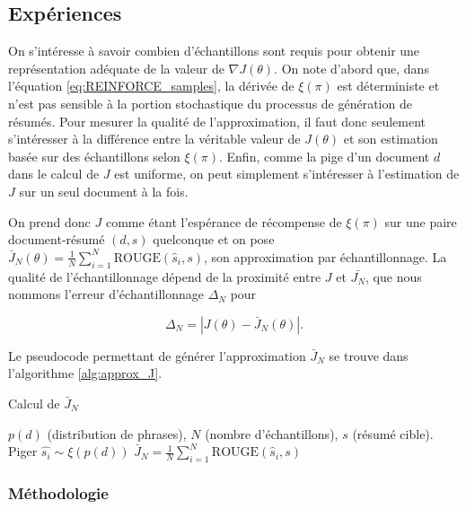 \subsection{Expériences}

On s'intéresse à savoir combien d'échantillons sont requis pour obtenir une représentation 
adéquate de la valeur de $\nabla J(\theta)$.
On note d'abord que, dans l'équation \eqref{eq:REINFORCE_samples}, la dérivée de $\xi(\pi)$ est déterministe
et n'est pas sensible à la portion stochastique du processus de génération de résumés.
Pour mesurer la qualité de l'approximation, il faut donc seulement s'intéresser
à la différence entre la véritable valeur de $J(\theta)$ et son estimation 
basée sur des échantillons selon $\xi(\pi)$.
Enfin, comme la pige d'un document $d$ dans le calcul de $J$ est uniforme, on
peut simplement s'intéresser à l'estimation de $J$ sur un seul document à la fois.


On prend donc $J$ comme étant l'espérance de récompense de $\xi(\pi)$ sur une paire 
document-résumé $(d, s)$ quelconque et on pose
 $\bar{J}_N(\theta) =  \frac{1}{N} \sum_{i=1}^N \text{ROUGE}(\hat{s}_i, s)$, son approximation par échantillonnage.
La qualité de l'échantillonnage dépend de la proximité entre $J$ et $\bar{J_N}$, que
nous nommons l'erreur d'échantillonnage $\Delta_N$ pour

\begin{equation}
    \Delta_N = \left| J(\theta) - \bar{J}_N(\theta) \right|.
    \label{eq:erreur_echantillonnage}
\end{equation}

Le pseudocode permettant de générer l'approximation $\bar{J}_N$ se trouve 
dans l'algorithme \ref{alg:approx_J}.

\begin{algorithm}[!h]
    \caption{Calcul de $\bar{J}_N$}
    \begin{algorithmic}[1]
        \Require $p(d)$ (distribution de phrases), $N$ (nombre d'échantillons), $s$ (résumé cible).
        \State Piger $\hat{s_i}\sim \xi\left(p(d)\right)$
        \EndFor
        \State $\bar{J}_N = \frac{1}{N} \sum_{i=1}^N \text{ROUGE}(\hat{s}_i, s)$
    \end{algorithmic}
    \label{alg:approx_J}
\end{algorithm}

\subsubsection*{Méthodologie}

